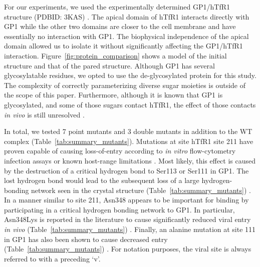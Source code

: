 \documentclass[12pt]{article}
\begin{document}
For our experiments, we used the experimentally determined GP1/hTfR1 structure (PDBID: 3KAS) \citep{Abraham2010}. The apical domain of hTfR1 interacts directly with GP1 while the other two domains are closer to the cell membrane and have essentially no interaction with GP1. The biophysical independence of the apical domain allowed us to isolate it without significantly affecting the GP1/hTfR1 interaction. Figure~\ref{fig:protein_comparison} shows a model of the initial structure and that of the pared structure. Although GP1 has several glycosylatable residues, we opted to use the de-glycosylated protein for this study. The complexity of correctly parameterizing diverse sugar moieties is outside of the scope of this paper. Furthermore, although it is known that GP1 is glycosylated, and some of those sugars contact hTfR1, the effect of those contacts \textit{in vivo} is still unresolved \citep{Abraham2010}.

In total, we tested 7 point mutants and 3 double mutants in addition to the WT complex (Table~\ref{tab:summary_mutants}). Mutations at site hTfR1 site 211 have proven capable of causing loss-of-entry according to \textit{in vitro} flow-cytometry infection assays or known host-range limitations \citep{Rad2008,Rad20111,Rad20112}. Most likely, this effect is caused by the destruction of a critical hydrogen bond to Ser113 or Ser111 in GP1. The lost hydrogen bond would lead to the subsequent loss of a large hydrogen-bonding network seen in the crystal structure (Table~\ref{tab:summary_mutants}) \citep{Abraham2010}. In a manner similar to site 211, Asn348 appears to be important for binding by participating in a critical hydrogen bonding network \citep{Rad2008,Abraham2010} to GP1. In particular, Asn348Lys is reported in the literature to cause significantly reduced viral entry \textit{in vivo} (Table~\ref{tab:summary_mutants}) \citep{Rad2008,Abraham2010}. Finally, an alanine mutation at site 111 in GP1 has also been shown to cause decreased entry (Table~\ref{tab:summary_mutants}) \citep{Rad20112}. For notation purposes, the viral site is always referred to with a preceding `v'.  
\end{document}
